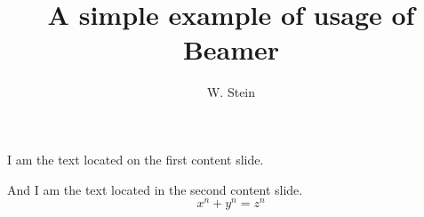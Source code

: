 \documentclass{beamer}
\title{A simple example of usage of Beamer}
\author{W. Stein}\institute{University of Washington}
\begin{document}
\begin{frame}
\titlepage

\end{frame}

\begin{frame}
I am the text located on the first content slide.
\end{frame}

\begin{frame}
And I am the text located in the second content slide.
$$
x^n + y^n = z^n
$$
\end{frame}
\end{document}
